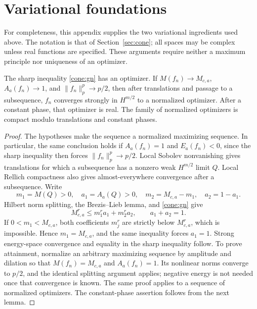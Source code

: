 \section{Variational foundations}\label{sec:foundations}

For completeness, this appendix supplies the two variational ingredients used above. The notation is that of Section~\ref{sec:cone}; all spaces may be complex unless real functions are specified. These arguments require neither a maximum principle nor uniqueness of an optimizer.

\begin{lemma}
\label{foundation:compact}
The sharp inequality \eqref{cone:gn} has an optimizer.
If $M(f_n)\to M_{c,a}$, $A_a(f_n)\to1$, and $\|f_n\|_p^p\to p/2$,
then after translations and passage to a subsequence,
$f_n$ converges strongly in $H^{m/2}$ to a normalized optimizer. After a constant phase, that optimizer is real. The family of normalized optimizers is compact modulo translations and constant phases.
\end{lemma}
\begin{proof}
The hypotheses make the sequence a normalized maximizing sequence. In particular, the same conclusion holds if $A_a(f_n)=1$ and $E_a(f_n)<0$, since the sharp inequality then forces $\|f_n\|_p^p\to p/2$.
Local Sobolev nonvanishing gives translations for which a subsequence
has a nonzero weak $H^{m/2}$ limit $Q$. Local Rellich compactness
also gives almost-everywhere convergence after a subsequence.
Write
\[
 m_1=M(Q)>0,\quad a_1=A_a(Q)>0,\quad
 m_2=M_{c,a}-m_1,\quad a_2=1-a_1.
\]
Hilbert norm splitting, the Brezis--Lieb lemma, and
\eqref{cone:gn} give
\[
 M_{c,a}^r\le m_1^ra_1+m_2^ra_2,\qquad a_1+a_2=1.
\]
If $0<m_1<M_{c,a}$, both coefficients $m_j^r$ are strictly below
$M_{c,a}^r$, which is impossible. Hence $m_1=M_{c,a}$, and the
same inequality forces $a_1=1$. Strong energy-space convergence
and equality in the sharp inequality follow.
To prove attainment, normalize an arbitrary maximizing sequence
by amplitude and dilation so that $M(f_n)=M_{c,a}$ and
$A_a(f_n)=1$. Its nonlinear norms converge to $p/2$, and the
identical splitting argument applies; negative energy is not
needed once that convergence is known. The same proof applies to a sequence of normalized optimizers. The constant-phase assertion follows from the next lemma.
\end{proof}

